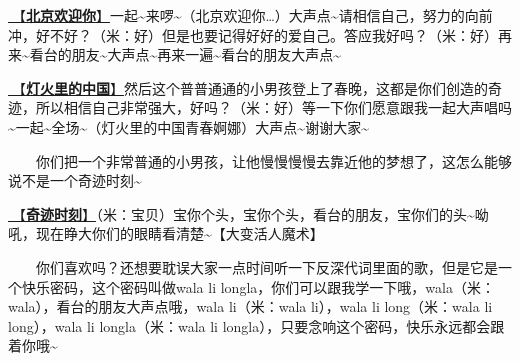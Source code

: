 \documentclass[]{ctexbook}
\begin{document}
\hyperref[welcome-to-beijing]{🎵【\textbf{北京欢迎你}】}一起\textasciitilde 来啰\textasciitilde（北京欢迎你\ldots）大声点\textasciitilde 请相信自己，努力的向前冲，好不好？（米：好）但是也要记得好好的爱自己。答应我好吗？（米：好）再来\textasciitilde 看台的朋友\textasciitilde 大声点\textasciitilde 再来一遍\textasciitilde 看台的朋友大声点\textasciitilde{}

\hyperref[China-in-the-light]{🎵【\textbf{灯火里的中国}】}然后这个普普通通的小男孩登上了春晚，这都是你们创造的奇迹，所以相信自己非常强大，好吗？（米：好）等一下你们愿意跟我一起大声唱吗\textasciitilde 一起\textasciitilde 全场\textasciitilde（灯火里的中国青春婀娜）大声点\textasciitilde 谢谢大家\textasciitilde{}

  你们把一个非常普通的小男孩，让他慢慢慢慢去靠近他的梦想了，这怎么能够说不是一个奇迹时刻\textasciitilde{}

\hyperref[magic-moment]{🎵【\textbf{奇迹时刻}】}（米：宝贝）宝你个头，宝你个头，看台的朋友，宝你们的头\textasciitilde 呦吼，现在睁大你们的眼睛看清楚\textasciitilde【大变活人魔术】

  你们喜欢吗？还想要耽误大家一点时间听一下反深代词里面的歌，但是它是一个快乐密码，这个密码叫做wala li longla，你们可以跟我学一下哦，wala（米：wala），看台的朋友大声点哦，wala li（米：wala li），wala li long（米：wala li long），wala li longla（米：wala li longla），只要念响这个密码，快乐永远都会跟着你哦\textasciitilde{}
\end{document}
